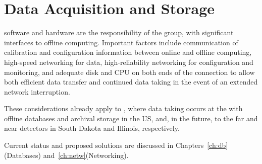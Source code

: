 \documentclass[../main-v1.tex]{subfiles}
\begin{document}






\section{Data Acquisition and Storage}

 software and hardware are the responsibility of the  group, with significant interfaces to offline computing. Important factors include communication of calibration and configuration information between online and offline computing, high-speed networking for data, high-reliability networking for configuration and monitoring, and adequate disk and CPU on both ends of the connection to allow both efficient data transfer and continued data taking in the event of an extended network interruption. 

These considerations already apply to , where data taking occurs at the  with offline databases and archival storage in the US,  and, in the future, to the far and near detectors in South Dakota and Illinois, respectively. 

Current status and proposed solutions are discussed in Chapters~\ref{ch:db}(Databases) and~\ref{ch:netw}(Networking). 
\end{document}
